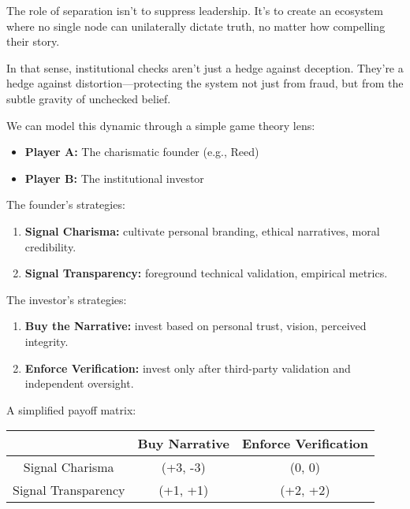     The role of separation isn’t to suppress leadership.  
    It’s to create an ecosystem where no single node can unilaterally dictate truth, no matter how compelling their story.
    
    \medskip
    
    In that sense, institutional checks aren’t just a hedge against deception.  
    They’re a hedge against distortion—protecting the system not just from fraud, but from the subtle gravity of unchecked belief.
    
    
    \medskip
    
    We can model this dynamic through a simple game theory lens:
    
    \begin{itemize}
        \item \textbf{Player A:} The charismatic founder (e.g., Reed)
        \item \textbf{Player B:} The institutional investor
    \end{itemize}
    
    The founder’s strategies:
    
    \begin{enumerate}
        \item \textbf{Signal Charisma:} cultivate personal branding, ethical narratives, moral credibility.
        \item \textbf{Signal Transparency:} foreground technical validation, empirical metrics.
    \end{enumerate}
    
    The investor’s strategies:
    
    \begin{enumerate}
        \item \textbf{Buy the Narrative:} invest based on personal trust, vision, perceived integrity.
        \item \textbf{Enforce Verification:} invest only after third-party validation and independent oversight.
    \end{enumerate}
    
    A simplified payoff matrix:
    
    \begin{center}
    \begin{tabular}{|c|c|c|}
    \hline
     & Buy Narrative & Enforce Verification \\
    \hline
    Signal Charisma & (+3, -3) & (0, 0) \\
    \hline
    Signal Transparency & (+1, +1) & (+2, +2) \\
    \hline
    \end{tabular}
    \end{center}
    
